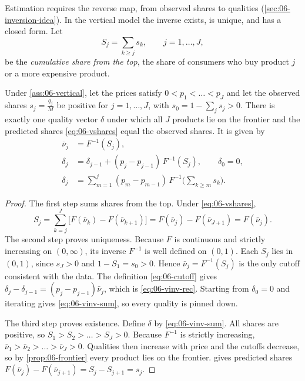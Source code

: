 Estimation requires the reverse map, from observed shares to qualities (\cref{sec:06-inversion-idea}). In
the vertical model the inverse exists, is unique, and has a closed form. Let
\begin{equation}\label{eq:06-cumshare}
  S_j = \sum_{k \ge j} s_k, \qquad j = 1, \dots, J,
\end{equation}
be the \emph{cumulative share from the top}, the share of consumers who buy product $j$ or a more
expensive product.

\begin{proposition}[Inversion]\label{prop:06-vinversion}
Under \cref{ass:06-vertical}, let the prices satisfy $0 < p_1 < \dots < p_J$ and let the observed shares
$s_j = \frac{q_j}{M}$ be positive for $j = 1, \dots, J$, with $s_0 = 1 - \sum_j s_j > 0$. There is exactly
one quality vector $\delta$ under which all $J$ products lie on the frontier and the predicted shares
\eqref{eq:06-vshares} equal the observed shares. It is given by
\begin{align}
  \bar\nu_j &= F^{-1}(S_j), \label{eq:06-vinv-cut}\\
  \delta_j &= \delta_{j-1} + (p_j - p_{j-1})\,F^{-1}(S_j), \qquad \delta_0 = 0, \label{eq:06-vinv-rec}\\
  \delta_j &= \sum_{m=1}^{j} (p_m - p_{m-1})\, F^{-1}\Big(\sum_{k \ge m} s_k\Big). \label{eq:06-vinv-sum}
\end{align}
\end{proposition}

\begin{proof}
The first step sums shares from the top. Under \eqref{eq:06-vshares},
\begin{equation*}
  S_j = \sum_{k=j}^{J} \big[F(\bar\nu_k) - F(\bar\nu_{k+1})\big] = F(\bar\nu_j) - F(\bar\nu_{J+1}) = F(\bar\nu_j).
\end{equation*}
The second step proves uniqueness. Because $F$ is continuous and strictly increasing on $(0,\infty)$, its
inverse $F^{-1}$ is well defined on $(0,1)$. Each $S_j$ lies in $(0,1)$, since $s_J > 0$ and
$1 - S_1 = s_0 > 0$. Hence $\bar\nu_j = F^{-1}(S_j)$ is the only cutoff consistent with the data. The
definition \eqref{eq:06-cutoff} gives $\delta_j - \delta_{j-1} = (p_j - p_{j-1})\bar\nu_j$, which is
\eqref{eq:06-vinv-rec}. Starting from $\delta_0 = 0$ and iterating gives \eqref{eq:06-vinv-sum}, so every
quality is pinned down.

The third step proves existence. Define $\delta$ by \eqref{eq:06-vinv-sum}. All shares are positive, so
$S_1 > S_2 > \dots > S_J > 0$. Because $F^{-1}$ is strictly increasing, $\bar\nu_1 > \bar\nu_2 > \dots > \bar\nu_J
> 0$. Qualities then increase with price and the cutoffs decrease, so by \cref{prop:06-frontier} every
product lies on the frontier.  gives predicted shares
$F(\bar\nu_j) - F(\bar\nu_{j+1}) = S_j - S_{j+1} = s_j$.
\end{proof}

